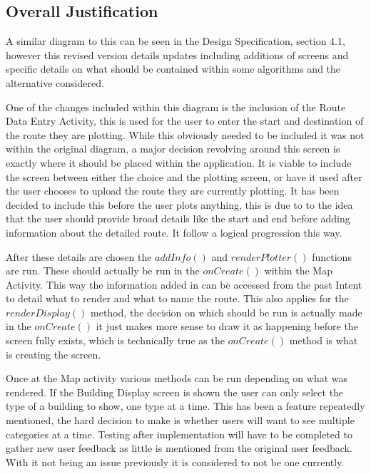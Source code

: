 \subsection{Overall Justification}
A similar diagram to this can be seen in the Design Specification, section 4.1, however this revised version details updates including additions of screens and specific details on what should be contained within some algorithms and the alternative considered. 

One of the changes included within this diagram is the inclusion of the Route Data Entry Activity, this is used for the user to enter the start and destination of the route they are plotting. While this obviously needed to be included it was not within the original diagram, a major decision revolving around this screen is exactly where it should be placed within the application. It is viable to include the screen between either the choice and the plotting screen, or have it used after the user chooses to upload the route they are currently plotting. It has been decided to include this before the user plots anything, this is due to to the idea that the user should provide broad details like the start and end before adding information about the detailed route. It follow a logical progression this way. 

After these details are chosen the $addInfo()$ and  $renderPlotter()$ functions are run. These should actually be run in the $onCreate()$ within the Map Activity. This way the information added in can be accessed from the past Intent to detail what to render and what to name the route. This also applies for the $renderDisplay()$ method, the decision on which should be run is actually made in the $onCreate()$ it just makes more sense to draw it as happening before the screen fully exists, which is technically true as the $onCreate()$ method is what is creating the screen. 

Once at the Map activity various methods can be run depending on what was rendered. If the Building Display screen is shown the user can only select the type of a building to show, one type at a time. This has been a feature repeatedly mentioned, the hard decision to make is whether users will want to see multiple categories at a time. Testing after implementation will have to be completed to gather new user feedback as little is mentioned from the original user feedback. With it not being an issue previously it is considered to not be one currently.


